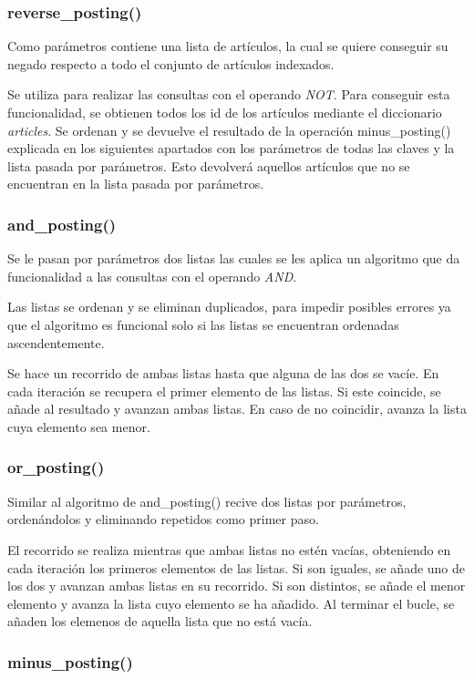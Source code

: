 \documentclass[12pt,a4paper]{article}
\begin{document}
\subsubsection{reverse\_posting()}
Como parámetros contiene una lista de artículos, la cual se quiere conseguir su negado respecto a todo el conjunto de artículos indexados.

Se utiliza para realizar las consultas con el operando \textit{NOT}. Para conseguir esta funcionalidad, se obtienen todos los id de los artículos mediante el diccionario \textit{articles}. Se ordenan y se devuelve el resultado de la operación minus\_posting() explicada en los siguientes apartados con los parámetros de todas las claves y la lista pasada por parámetros. Esto devolverá aquellos artículos que no se encuentran en la lista pasada por parámetros.

\subsubsection{and\_posting()}
Se le pasan por parámetros dos listas las cuales se les aplica un algoritmo que da funcionalidad a las consultas con el operando \textit{AND}.

Las listas se ordenan y se eliminan duplicados, para impedir posibles errores ya que el algoritmo es funcional solo si las listas se encuentran ordenadas ascendentemente.

Se hace un recorrido de ambas listas hasta que alguna de las dos se vacíe. En cada iteración se recupera el primer elemento de las listas. Si este coincide, se añade al resultado y avanzan ambas listas. En caso de no coincidir, avanza la lista cuya elemento sea menor.

\subsubsection{or\_posting()}
Similar al algoritmo de and\_posting() recive dos listas por parámetros, ordenándolos y eliminando repetidos como primer paso.

El recorrido se realiza mientras que ambas listas no estén vacías, obteniendo en cada iteración los primeros elementos de las listas. Si son iguales, se añade uno de los dos y avanzan ambas listas en su recorrido. Si son distintos, se añade el menor elemento y avanza la lista cuyo elemento se ha añadido. Al terminar el bucle, se añaden los elemenos de aquella lista que no está vacía.

\subsubsection{minus\_posting()}
\end{document}
